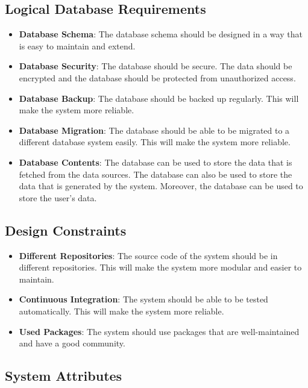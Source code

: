 \documentclass[a4paper]{article}
\begin{document}
        \subsection{Logical Database Requirements}

            \begin{itemize}
                \item \textbf{Database Schema}: The database schema should be designed in a way that is easy to maintain and extend.
                \item \textbf{Database Security}: The database should be secure. The data should be encrypted and the database should be protected from unauthorized access.
                \item \textbf{Database Backup}: The database should be backed up regularly. This will make the system more reliable.
                \item \textbf{Database Migration}: The database should be able to be migrated to a different database system easily. This will make the system more reliable.
                \item \textbf{Database Contents}: The database can be used to store the data that is fetched from the data sources. The database can also be used to store the data that is generated by the system.
                Moreover, the database can be used to store the user's data.
            \end{itemize}

        \subsection{Design Constraints}

        \begin{itemize}
            \item \textbf{Different Repositories}: The source code of the system should be in different repositories. This will make the system more modular and easier to maintain.
            \item \textbf{Continuous Integration}: The system should be able to be tested automatically. This will make the system more reliable.
            \item \textbf{Used Packages}: The system should use packages that are well-maintained and have a good community.
        \end{itemize}

        \subsection{System Attributes}
\end{document}
